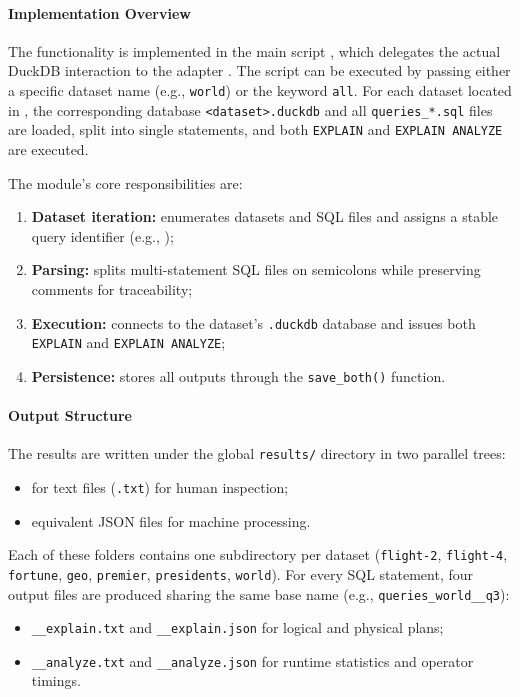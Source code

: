 \documentclass[12pt,a4paper]{article}
\begin{document}
\paragraph{Implementation Overview}
The functionality is implemented in the main script
, which delegates the
actual DuckDB interaction to the adapter
. The script can be executed by passing
either a specific dataset name (e.g., \texttt{world}) or the keyword
\texttt{all}. For each dataset located in
, the corresponding database
\texttt{<dataset>.duckdb} and all \texttt{queries\_*.sql} files are loaded,
split into single statements, and both \texttt{EXPLAIN} and
\texttt{EXPLAIN ANALYZE} are executed.

The module’s core responsibilities are:
\begin{enumerate}
  \item \textbf{Dataset iteration:} enumerates datasets and SQL files and assigns a stable query identifier
        (e.g., );
  \item \textbf{Parsing:} splits multi-statement SQL files on semicolons while preserving comments for traceability;
  \item \textbf{Execution:} connects to the dataset’s \texttt{.duckdb} database and issues both \texttt{EXPLAIN} and
        \texttt{EXPLAIN ANALYZE};
  \item \textbf{Persistence:} stores all outputs through the \texttt{save\_both()} function.
\end{enumerate}

\paragraph{Output Structure}
The results are written under the global \texttt{results/} directory in two
parallel trees:
\begin{itemize}
  \item {} for text files (\texttt{.txt}) for human inspection;
  \item {} equivalent JSON files for machine processing.
\end{itemize}

Each of these folders contains one subdirectory per dataset
(\texttt{flight-2}, \texttt{flight-4}, \texttt{fortune}, \texttt{geo},
\texttt{premier}, \texttt{presidents}, \texttt{world}). For every SQL statement,
four output files are produced sharing the same base name (e.g.,
\texttt{queries\_world\_\_q3}):
\begin{itemize}
  \item \texttt{\_\_explain.txt} and \texttt{\_\_explain.json} for logical and physical plans;
  \item \texttt{\_\_analyze.txt} and \texttt{\_\_analyze.json} for runtime statistics and operator timings.
\end{itemize}
\end{document}
